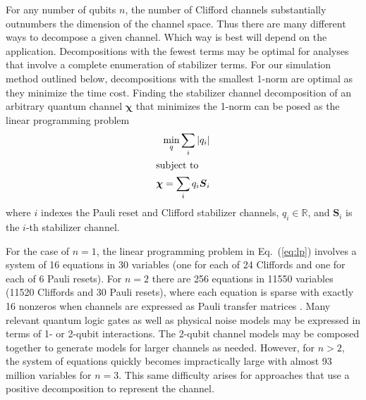 \documentclass[twocolumn,pra]{revtex4}
\newcommand{\bs}[1]{\boldsymbol{#1}}
\begin{document}
\par
For any number of qubits $n$, the number of Clifford channels substantially outnumbers the dimension of the channel space. Thus there are many different ways to decompose a given channel. Which way is best will depend on the application. Decompositions with the fewest terms may be optimal for analyses that involve a complete enumeration of stabilizer terms. For our simulation method outlined below, decompositions with the smallest 1-norm are optimal as they minimize the time cost. Finding the stabilizer channel decomposition of an arbitrary quantum channel $\bs{\chi}$  that minimizes the 1-norm can be posed as the linear programming problem
\begin{subequations}
\label{eq:lp}
\begin{align}
\min_ q \sum_i | q_i| \\
\intertext{subject to}
\bs{\chi} = \sum_i  q_i \bs{S}_i
\end{align}
\end{subequations}
where $i$ indexes the Pauli reset and Clifford stabilizer channels, $ q_i \in \mathbb{R}$, and $\bs{S}_i$ is the $i$-th stabilizer channel.
\par
For the case of $n = 1$, the linear programming problem in Eq.~(\ref{eq:lp}) involves a system of 16 equations in 30 variables (one for each of 24 Cliffords and one for each of 6 Pauli resets).
For $n = 2$ there are 256 equations in 11550 variables (11520 Cliffords and 30 Pauli resets), where each equation is sparse with exactly 16 nonzeros when channels are expressed as Pauli transfer matrices \cite{Chow2012}. Many relevant quantum logic gates as well as physical noise models may be expressed in terms of 1- or 2-qubit interactions. The 2-qubit channel models may be composed together to generate models for larger channels as needed. However, for $n>2$, the system of equations quickly becomes impractically large with almost 93 million variables for $n=3$. This same difficulty arises for approaches that use a positive decomposition to represent the channel.
\end{document}

